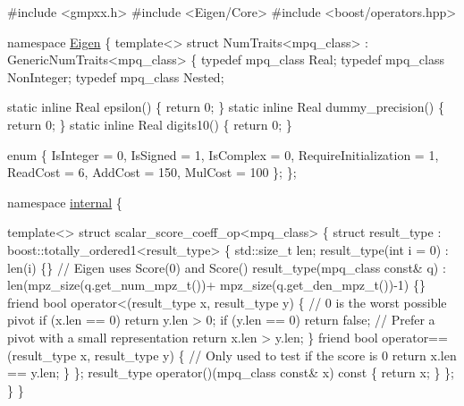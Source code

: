 \begin{DoxyCode}
\textcolor{preprocessor}{#include <gmpxx.h>}
\textcolor{preprocessor}{#include <Eigen/Core>}
\textcolor{preprocessor}{#include <boost/operators.hpp>}

\textcolor{keyword}{namespace }\hyperlink{namespace_eigen}{Eigen} \{
  \textcolor{keyword}{template}<> \textcolor{keyword}{struct }NumTraits<mpq\_class> : GenericNumTraits<mpq\_class>
  \{
    \textcolor{keyword}{typedef} mpq\_class Real;
    \textcolor{keyword}{typedef} mpq\_class NonInteger;
    \textcolor{keyword}{typedef} mpq\_class Nested;

    \textcolor{keyword}{static} \textcolor{keyword}{inline} Real epsilon() \{ \textcolor{keywordflow}{return} 0; \}
    \textcolor{keyword}{static} \textcolor{keyword}{inline} Real dummy\_precision() \{ \textcolor{keywordflow}{return} 0; \}
    \textcolor{keyword}{static} \textcolor{keyword}{inline} Real digits10() \{ \textcolor{keywordflow}{return} 0; \}

    \textcolor{keyword}{enum} \{
      IsInteger = 0,
      IsSigned = 1,
      IsComplex = 0,
      RequireInitialization = 1,
      ReadCost = 6,
      AddCost = 150,
      MulCost = 100
    \};
  \};

  \textcolor{keyword}{namespace }\hyperlink{namespaceinternal}{internal} \{

    \textcolor{keyword}{template}<> \textcolor{keyword}{struct }scalar\_score\_coeff\_op<mpq\_class> \{
      \textcolor{keyword}{struct }result\_type : boost::totally\_ordered1<result\_type> \{
        std::size\_t len;
        result\_type(\textcolor{keywordtype}{int} i = 0) : len(i) \{\} \textcolor{comment}{// Eigen uses Score(0) and Score()}
        result\_type(mpq\_class \textcolor{keyword}{const}& q) :
          len(mpz\_size(q.get\_num\_mpz\_t())+
              mpz\_size(q.get\_den\_mpz\_t())-1) \{\}
        \textcolor{keyword}{friend} \textcolor{keywordtype}{bool} operator<(result\_type x, result\_type y) \{
          \textcolor{comment}{// 0 is the worst possible pivot}
          \textcolor{keywordflow}{if} (x.len == 0) \textcolor{keywordflow}{return} y.len > 0;
          \textcolor{keywordflow}{if} (y.len == 0) \textcolor{keywordflow}{return} \textcolor{keyword}{false};
          \textcolor{comment}{// Prefer a pivot with a small representation}
          \textcolor{keywordflow}{return} x.len > y.len;
        \}
        \textcolor{keyword}{friend} \textcolor{keywordtype}{bool} operator==(result\_type x, result\_type y) \{
          \textcolor{comment}{// Only used to test if the score is 0}
          \textcolor{keywordflow}{return} x.len == y.len;
        \}
      \};
      result\_type operator()(mpq\_class \textcolor{keyword}{const}& x)\textcolor{keyword}{ const }\{ \textcolor{keywordflow}{return} x; \}
    \};
  \}
\}
\end{DoxyCode}
